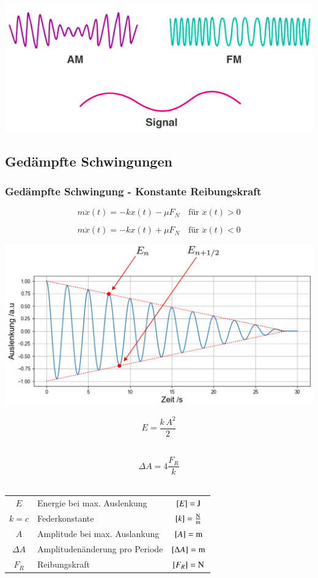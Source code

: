 \includegraphics[width=0.65\linewidth]{Bilder/Wellen-Optik/AM_FM}



\subsection{Gedämpfte Schwingungen}

\subsubsection{Gedämpfte Schwingung - Konstante Reibungskraft}

$$ m \ddot{x}(t) = -k x(t) - \mu F_N \quad \text{für } \ddot{x}(t) > 0 $$

$$ m \ddot{x}(t) = -k x(t) + \mu F_N \quad \text{für } \ddot{x}(t) < 0 $$


\includegraphics[width=0.7\linewidth]{Bilder/Wellen-Optik/gedaempfte_schwingungen_konst_reibung} 




\begin{minipage}{0.48\linewidth}
$$ \boxed{ E = \frac{k \, A^2}{2} } $$ \\
\end{minipage}
\hfill
\begin{minipage}{0.48\linewidth}
$$ \boxed{ \Delta A = 4 \frac{F_R}{k}} $$ \\
\end{minipage}


\begin{tabular}{c l c}
$E$ & Energie bei max. Auslenkung & $[E] = \mathrm{J}$ \\
$k=c$ & Federkonstante & $[k] = \frac{\mathrm{N}}{\mathrm{m}}$ \\
$A$ & Amplitude bei max. Auslankung & $[A] = \mathrm{m}$ \\
$\Delta A$ & Amplitudenänderung pro Periode & $[\Delta A] = \mathrm{m}$ \\
$F_R$ & Reibungskraft & $[F_R] = \mathrm{N}$ 
\end{tabular}



